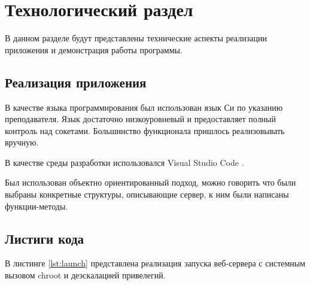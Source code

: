\section{Технологический раздел}

В данном разделе будут представлены технические аспекты реализации приложения и демонстрация работы программы.

\subsection{Реализация приложения}

В качестве языка программирования был использован язык Си \cite{clang} по указанию преподавателя. Язык достаточно низкоуровневый и предоставляет полный контроль над сокетами. Большинство функционала пришлось реализовывать вручную.

В качестве среды разработки использовался Visual Studio Code \cite{vscode}.

Был использован объектно ориентированный подход, можно говорить что были выбраны конкретные структуры, описывающие сервер, к ним были написаны функции-методы.

\subsection{Листиги кода}

В листинге \ref{lst:launch} представлена реализация запуска веб-сервера с системным вызовом chroot и деэскалацией привелегий.

